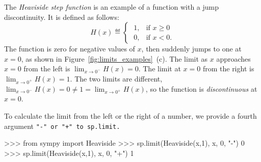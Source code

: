 


The \emph{Heaviside step function} is an example of a function
with a jump discontinuity.
It is defined as follows:
\[
	H(x) \eqdef \begin{cases}
				\; 1, 	& \text{if } x \geq 0 \\
				\; 0, 	& \text{if } x < 0.
			\end{cases}
\]
The function is zero for negative values of $x$,
then suddenly jumps to one at $x=0$,
as shown in Figure~\ref{fig:limits_examples}~(c).
The limit as $x$ approaches $x=0$ from the left is $\lim_{x\to 0^-} H(x) = 0$.
The limit at $x=0$ from the right is $\lim_{x\to 0^+} H(x) = 1$.
The two limits are different,
$\lim_{x\to 0^-} H(x) = 0 \neq 1 = \lim_{x\to 0^+} H(x)$,
so the function is \emph{discontinuous} at $x=0$.



\noindent
To calculate the limit from the left or the right of a number,
we provide a fourth argument \tt{"-"} or \tt{"+"} to \tt{sp.limit}.


\begin{codeblock}[]
>>> from sympy import Heaviside
>>> sp.limit(Heaviside(x,1), x, 0, "-")
0
>>> sp.limit(Heaviside(x,1), x, 0, "+")
1
\end{codeblock}

